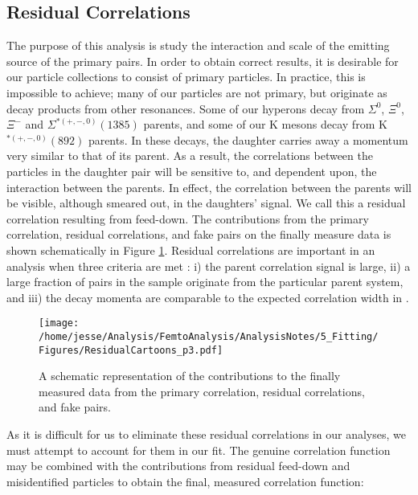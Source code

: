 \documentclass[/home/jesse/Analysis/FemtoAnalysis/AnalysisNotes/AnalysisNoteJBuxton.tex]{subfiles}
\begin{document}
\subsection{Residual Correlations}
\label{ResidualCorrelations}

The purpose of this analysis is study the interaction and scale of the emitting source of the primary \LamK pairs.
In order to obtain correct results, it is desirable for our particle collections to consist of primary particles.
In practice, this is impossible to achieve; many of our particles are not primary, but originate as decay products from other resonances.
Some of our \Lam hyperons decay from $\Sigma^{0}$, $\Xi^{0}$, $\Xi^{-}$ and $\Sigma^{*(+,-,0)}(1385)$ parents, and some of our K mesons decay from K$^{*(+,-,0)}(892)$ parents.
In these decays, the daughter carries away a momentum very similar to that of its parent.
As a result, the correlations between the particles in the daughter pair will be sensitive to, and dependent upon, the interaction between the parents.
In effect, the correlation between the parents will be visible, although smeared out, in the daughters' signal.
We call this a residual correlation resulting from feed-down.  
The contributions from the primary correlation, residual correlations, and fake pairs on the finally measure data is shown schematically in Figure \ref{fig:ResidualsCartoon}.
Residual correlations are important in an analysis when three criteria are met \cite{Kisiel:2014mma}: i) the parent correlation signal is large, ii) a large fraction of pairs in the sample originate from the particular parent system, and iii) the decay momenta are comparable to the expected correlation width in \kstar. 


\begin{figure}[h]
  \centering
  \texttt{[image: /home/jesse/Analysis/FemtoAnalysis/AnalysisNotes/5\_Fitting/Figures/ResidualCartoons\_p3.pdf]}
  \caption[Residual Contributions Cartoon]{A schematic representation of the contributions to the finally measured data from the primary correlation, residual correlations, and fake pairs.}
  \label{fig:ResidualsCartoon}
\end{figure}


As it is difficult for us to eliminate these residual correlations in our analyses, we must attempt to account for them in our fit.
The genuine \LamK correlation function may be combined with the contributions from residual feed-down and misidentified particles to obtain the final, measured correlation function:
\end{document}
